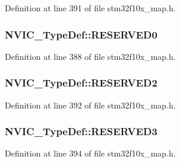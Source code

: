 Definition at line 391 of file stm32f10x\+\_\+map.\+h.

\subsubsection[{\texorpdfstring{R\+E\+S\+E\+R\+V\+E\+D0}{RESERVED0}}]{ N\+V\+I\+C\+\_\+\+Type\+Def\+::\+R\+E\+S\+E\+R\+V\+E\+D0}\hypertarget{struct_n_v_i_c___type_def_a3747e6321d53cb6238f757dba217c5fb}{}\label{struct_n_v_i_c___type_def_a3747e6321d53cb6238f757dba217c5fb}


Definition at line 388 of file stm32f10x\+\_\+map.\+h.

\subsubsection[{\texorpdfstring{R\+E\+S\+E\+R\+V\+E\+D2}{RESERVED2}}]{ N\+V\+I\+C\+\_\+\+Type\+Def\+::\+R\+E\+S\+E\+R\+V\+E\+D2}\hypertarget{struct_n_v_i_c___type_def_ae42aff2d808aa13271e5176c4bfe8dc6}{}\label{struct_n_v_i_c___type_def_ae42aff2d808aa13271e5176c4bfe8dc6}


Definition at line 392 of file stm32f10x\+\_\+map.\+h.

\subsubsection[{\texorpdfstring{R\+E\+S\+E\+R\+V\+E\+D3}{RESERVED3}}]{ N\+V\+I\+C\+\_\+\+Type\+Def\+::\+R\+E\+S\+E\+R\+V\+E\+D3}\hypertarget{struct_n_v_i_c___type_def_ab9ad46e0a62dad26e881bcdd9d21c07a}{}\label{struct_n_v_i_c___type_def_ab9ad46e0a62dad26e881bcdd9d21c07a}


Definition at line 394 of file stm32f10x\+\_\+map.\+h.

